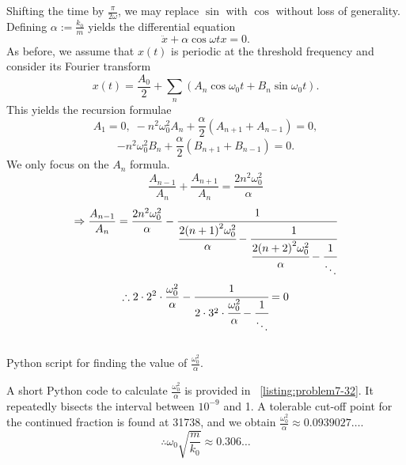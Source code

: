 \item

Shifting the time by $\frac{\pi}{2\omega}$,
we may replace $\sin$ with $\cos$ without loss of generality.
Defining $\alpha := \frac{k_0}{m}$ yields the differential equation
\[
    \ddot{x} + \alpha \cos \omega t x = 0.
\]
As before, we assume that $x(t)$ is periodic at the threshold frequency
and consider its Fourier transform
\[
    x(t)
    = \frac{A_0}{2} + \sum_n \left(
        A_n \cos \omega_0 t + B_n \sin \omega_0 t
    \right).
\]
This yields the recursion formulae
\[
    A_1 = 0,\;
    -n^2 \omega_0^2 A_n + \frac{\alpha}{2} \left( A_{n + 1} + A_{n - 1} \right) = 0,
\]
\[
    -n^2 \omega_0^2 B_n + \frac{\alpha}{2} \left( B_{n + 1} + B_{n - 1} \right) = 0.
\]
We only focus on the $A_n$ formula.
\[
    \frac{A_{n - 1}}{A_n} + \frac{A_{n + 1}}{A_n}
    = \frac{2n^2 \omega_0^2}{\alpha}
\]
\[
    \Rightarrow \frac{A_{n - 1}}{A_n}
    = \frac{2n^2 \omega_0^2}{\alpha} - \cfrac{1}{
        \cfrac{2{(n + 1)}^2 \omega_0^2}{\alpha} - \cfrac{1}{
            \cfrac{2{(n + 2)}^2 \omega_0^2}{\alpha} - \cfrac{1}{\ddots}
        }
    }
\]
\[
    \therefore 2\cdot 2^2 \cdot \frac{\omega_0^2}{\alpha} - \cfrac{1}{
        2\cdot 3^2 \cdot \cfrac{\omega_0^2}{\alpha} - \cfrac{1}{\ddots}
    } = 0
\]

\begin{listing}[!ht]
    \centering %
    \inputminted[linenos, fontsize=\footnotesize]{python}{src/ch7/exercise7.32.py}
    \caption{Python script for finding the value of $\frac{\omega_0^2}{\alpha}$.}
    \label{listing:problem7-32}
\end{listing}

A short Python code to calculate $\frac{\omega_0^2}{\alpha}$
is provided in ~\ref{listing:problem7-32}.
It repeatedly bisects the interval between $10^{-9}$ and 1.
A tolerable cut-off point for the continued fraction is found at 31738,
and we obtain $\frac{\omega_0^2}{\alpha} \approx 0.0939027\dots$.
\[
    \therefore \omega_0 \sqrt{\frac{m}{k_0}}
    \approx 0.306\dots
\]
